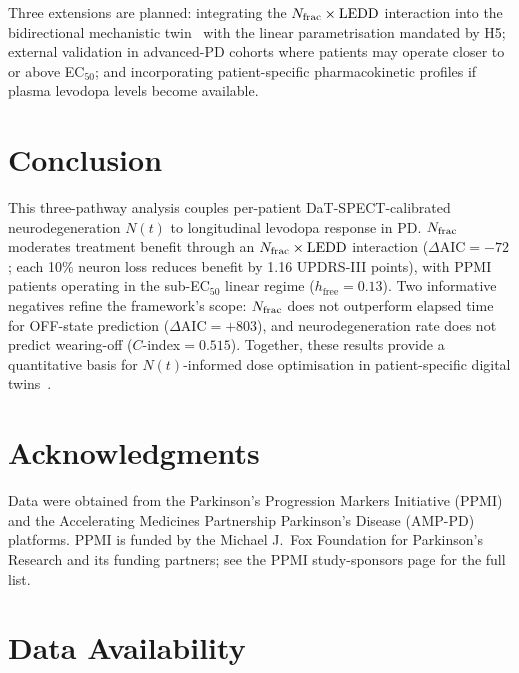 Three extensions are planned: integrating the $N_{\mathrm{frac}} \times \mathrm{LEDD}$ interaction into the bidirectional mechanistic twin~\cite{dupre2026paper10} with the linear parametrisation mandated by H5; external validation in advanced-PD cohorts where patients may operate closer to or above EC$_{50}$; and incorporating patient-specific pharmacokinetic profiles if plasma levodopa levels become available.


\section{Conclusion}

This three-pathway analysis couples per-patient DaT-SPECT-calibrated neurodegeneration $N(t)$ to longitudinal levodopa response in PD. $N_{\mathrm{frac}}$ moderates treatment benefit through an $N_{\mathrm{frac}} \times \mathrm{LEDD}$ interaction ($\Delta\mathrm{AIC}=-72$; each 10\% neuron loss reduces benefit by 1.16 UPDRS-III points), with PPMI patients operating in the sub-EC$_{50}$ linear regime ($h_\text{free}=0.13$). Two informative negatives refine the framework's scope: $N_{\mathrm{frac}}$ does not outperform elapsed time for OFF-state prediction ($\Delta\mathrm{AIC}=+803$), and neurodegeneration rate does not predict wearing-off ($C$-index$=0.515$). Together, these results provide a quantitative basis for $N(t)$-informed dose optimisation in patient-specific digital twins~\cite{dupre2026paper10}.


\section*{Acknowledgments}

Data were obtained from the Parkinson's Progression Markers Initiative (PPMI) and the Accelerating Medicines Partnership Parkinson's Disease (AMP-PD) platforms. PPMI is funded by the Michael J.\ Fox Foundation for Parkinson's Research and its funding partners; see the PPMI study-sponsors page for the full list.


\section*{Data Availability}

